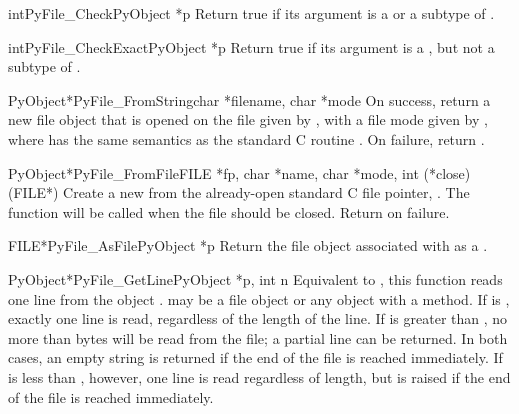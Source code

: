 \begin{cfuncdesc}{int}{PyFile_Check}{PyObject *p}
  Return true if its argument is a  or a subtype
  of .
\end{cfuncdesc}

\begin{cfuncdesc}{int}{PyFile_CheckExact}{PyObject *p}
  Return true if its argument is a , but not a
  subtype of .
\end{cfuncdesc}

\begin{cfuncdesc}{PyObject*}{PyFile_FromString}{char *filename, char *mode}
  On success, return a new file object that is opened on the file
  given by , with a file mode given by , where
   has the same semantics as the standard C routine
  .  On failure, return \NULL{}.
\end{cfuncdesc}

\begin{cfuncdesc}{PyObject*}{PyFile_FromFile}{FILE *fp,
                                              char *name, char *mode,
                                              int (*close)(FILE*)}
  Create a new  from the already-open standard C
  file pointer, .  The function  will be called
  when the file should be closed.  Return \NULL{} on failure.
\end{cfuncdesc}

\begin{cfuncdesc}{FILE*}{PyFile_AsFile}{PyObject *p}
  Return the file object associated with  as a .
\end{cfuncdesc}

\begin{cfuncdesc}{PyObject*}{PyFile_GetLine}{PyObject *p, int n}
  Equivalent to , this
  function reads one line from the object .   may be a
  file object or any object with a  method.  If
   is , exactly one line is read, regardless of the
  length of the line.  If  is greater than , no more
  than  bytes will be read from the file; a partial line can be
  returned.  In both cases, an empty string is returned if the end of
  the file is reached immediately.  If  is less than ,
  however, one line is read regardless of length, but
   is raised if the end of the file is reached
  immediately.
\end{cfuncdesc}

